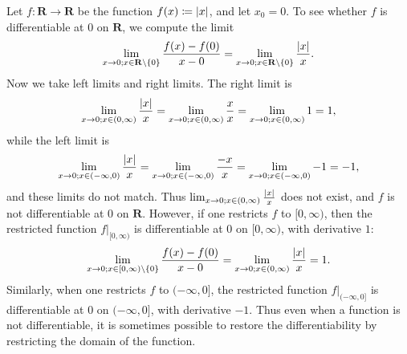 \begin{example}\label{10.1.6}
    Let \(f : \mathbf{R} \to \mathbf{R}\) be the function \(f(x) \coloneqq \abs*{x}\), and let \(x_0 = 0\).
    To see whether \(f\) is differentiable at \(0\) on \(\mathbf{R}\), we compute the limit
    \[
        \lim_{x \to 0 ; x \in \mathbf{R} \setminus \{0\}} \frac{f(x) - f(0)}{x - 0} = \lim_{x \to 0 ; x \in \mathbf{R} \setminus \{0\}} \frac{\abs*{x}}{x}.
    \]
    Now we take left limits and right limits.
    The right limit is
    \[
        \lim_{x \to 0 ; x \in (0, \infty)} \frac{\abs*{x}}{x} = \lim_{x \to 0 ; x \in (0, \infty)} \frac{x}{x} = \lim_{x \to 0 ; x \in (0, \infty)} 1 = 1,
    \]
    while the left limit is
    \[
        \lim_{x \to 0 ; x \in (-\infty, 0)} \frac{\abs*{x}}{x} = \lim_{x \to 0 ; x \in (-\infty, 0)} \frac{-x}{x} = \lim_{x \to 0 ; x \in (-\infty, 0)} -1 = -1,
    \]
    and these limits do not match.
    Thus \(\lim_{x \to 0 ; x \in (0, \infty)} \frac{\abs*{x}}{x}\) does not exist, and \(f\) is not differentiable at \(0\) on \(\mathbf{R}\).
    However, if one restricts \(f\) to \([0, \infty)\), then the restricted function \(f|_{[0, \infty)}\) is differentiable at \(0\) on \([0, \infty)\), with derivative \(1\):
    \[
    \lim_{x \to 0 ; x \in [0, \infty) \setminus \{0\}} \frac{f(x) - f(0)}{x - 0} = \lim_{x \to 0 ; x \in (0, \infty)} \frac{\abs*{x}}{x} = 1.
        \]
        Similarly, when one restricts \(f\) to \((-\infty, 0]\), the restricted function \(f|_{(-\infty, 0]}\) is differentiable at \(0\) on \((-\infty, 0]\), with derivative \(-1\).
    Thus even when a function is not differentiable, it is sometimes possible to restore the differentiability by restricting the domain of the function.
\end{example}